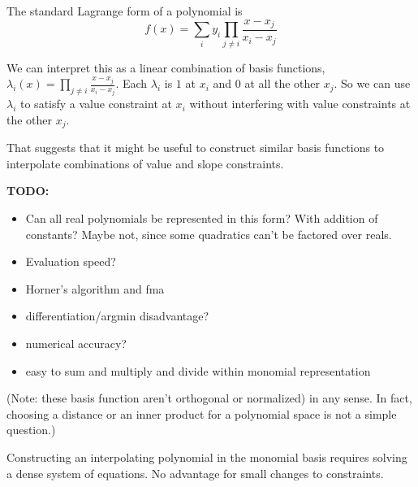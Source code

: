 % 

%

% 
% 

\restoregeometry
\setcounter{currentlevel}{\value{baseSectionLevel}}
\label{sec:Lagrange-basis}

The standard Lagrange\cite{wiki:Lagrange-polynomial}
form of a polynomial  is
\begin{equation}
f(x) = \sum_{i} y_i \prod_{j \neq i} \frac{x - x_j}{x_i -x_j}
\end{equation}

We can interpret this as a linear combination of basis functions,
$\lambda_i (x) = \prod_{j \neq i} \frac{x - x_j}{x_i -x_j}$.
Each $\lambda_i$ is $1$ at $x_i$ and $0$ at all the other $x_j$.
So we can use $\lambda_i$ to satisfy a value constraint at $x_i$
without interfering with value constraints at the other $x_j$.

That suggests that it might be useful to construct similar basis
functions to interpolate combinations of value and slope 
constraints.

\textbf{TODO:} 
\begin{itemize}
  \item Can all real polynomials be represented in this form? 
        With addition of constants? Maybe not, since some
        quadratics can't be factored over reals.
  \item Evaluation speed?
  \item Horner's algorithm and fma
  \item differentiation/argmin disadvantage?
  \item numerical accuracy?
  \item easy to sum and multiply and divide within monomial
  representation
\end{itemize}

(Note: these basis function aren't orthogonal or normalized)
in any
sense. In fact, choosing a distance or an inner product for
a polynomial space is not a simple question.)

Constructing an interpolating polynomial in the monomial basis
requires solving a dense system of equations. 
No advantage for small changes to constraints.

